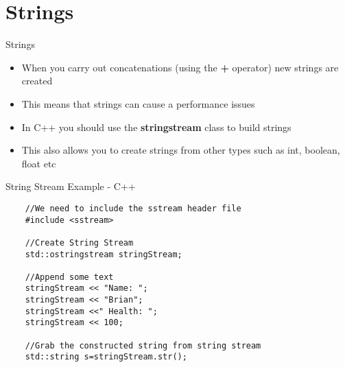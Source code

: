 \part{Strings}
\frame{\partpage}

\begin{frame}{Strings}
	\begin{itemize}
		\pause \item When you carry out concatenations (using the \textbf{+} operator) new strings are created
		\pause \item This means that strings can cause a performance issues
		\pause \item In C++ you should use the \textbf{stringstream} class to build strings
		\pause \item This also allows you to create strings from other types such as int, boolean, float etc
	\end{itemize}
\end{frame}

\begin{frame}[fragile]{String Stream Example - C++}
	\begin{lstlisting}
	//We need to include the sstream header file
	#include <sstream>
	
	//Create String Stream
	std::ostringstream stringStream;
	
	//Append some text
	stringStream << "Name: ";
	stringStream << "Brian";
	stringStream <<" Health: ";
	stringStream << 100;
	
	//Grab the constructed string from string stream
	std::string s=stringStream.str();
	
	\end{lstlisting}
\end{frame}